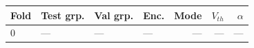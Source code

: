 \begin{tabular}{llllrrr}
\toprule
Fold & Test grp. & Val grp. & Enc. & Mode & $V_{th}$ & $\alpha$ \\
\midrule
0 & --- & --- & --- & --- & --- & --- \\
\bottomrule
\end{tabular}
